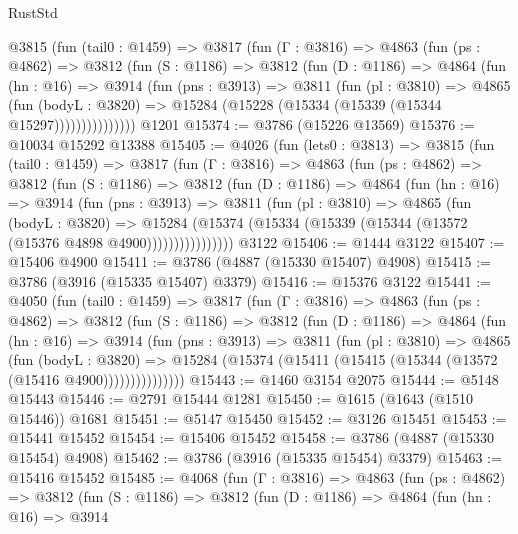 \begin{lexlean}{RustStd}
\begin{coremodule}
      @3815
        (fun (tail0 : @1459) =>
        @3817
          (fun (Γ : @3816) =>
          @4863
            (fun (ps : @4862) =>
            @3812
              (fun (S : @1186) =>
              @3812
                (fun (D : @1186) =>
                @4864
                  (fun (hn : @16) =>
                  @3914
                    (fun (pns : @3913) =>
                    @3811
                      (fun (pl : @3810) =>
                      @4865
                        (fun (bodyL : @3820) =>
                        @15284 (@15228 (@15334 (@15339 (@15344 @15297)))))))))))))))
    @1201
@15374 := @3786 (@15226 @13569)
@15376 := @10034 @15292 @13388
@15405 := @4026
    (fun (lets0 : @3813) =>
    @3815
      (fun (tail0 : @1459) =>
      @3817
        (fun (Γ : @3816) =>
        @4863
          (fun (ps : @4862) =>
          @3812
            (fun (S : @1186) =>
            @3812
              (fun (D : @1186) =>
              @4864
                (fun (hn : @16) =>
                @3914
                  (fun (pns : @3913) =>
                  @3811
                    (fun (pl : @3810) =>
                    @4865
                      (fun (bodyL : @3820) =>
                      @15284
                        (@15374 (@15334 (@15339 (@15344 (@13572 (@15376 @4898 @4900))))))))))))))))
    @3122
@15406 := @1444 @3122
@15407 := @15406 @4900
@15411 := @3786 (@4887 (@15330 @15407) @4908)
@15415 := @3786 (@3916 (@15335 @15407) @3379)
@15416 := @15376 @3122
@15441 := @4050
    (fun (tail0 : @1459) =>
    @3817
      (fun (Γ : @3816) =>
      @4863
        (fun (ps : @4862) =>
        @3812
          (fun (S : @1186) =>
          @3812
            (fun (D : @1186) =>
            @4864
              (fun (hn : @16) =>
              @3914
                (fun (pns : @3913) =>
                @3811
                  (fun (pl : @3810) =>
                  @4865
                    (fun (bodyL : @3820) =>
                    @15284 (@15374 (@15411 (@15415 (@15344 (@13572 (@15416 @4900)))))))))))))))
@15443 := @1460 @3154 @2075
@15444 := @5148 @15443
@15446 := @2791 @15444 @1281
@15450 := @1615 (@1643 (@1510 @15446)) @1681
@15451 := @5147 @15450
@15452 := @3126 @15451
@15453 := @15441 @15452
@15454 := @15406 @15452
@15458 := @3786 (@4887 (@15330 @15454) @4908)
@15462 := @3786 (@3916 (@15335 @15454) @3379)
@15463 := @15416 @15452
@15485 := @4068
    (fun (Γ : @3816) =>
    @4863
      (fun (ps : @4862) =>
      @3812
        (fun (S : @1186) =>
        @3812
          (fun (D : @1186) =>
          @4864
            (fun (hn : @16) =>
            @3914

\end{coremodule}
\end{lexlean}
